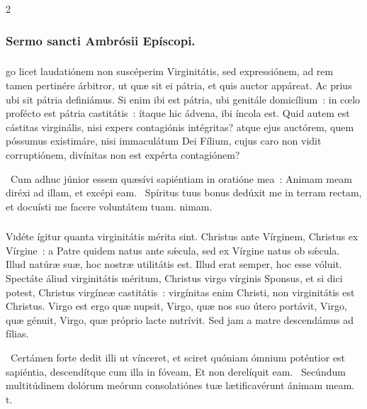 \documentclass[9pt,twoside]{extarticle}
\begin{document}
\begin{multicols}{2}
{{{\subsubsection*{\center Sermo sancti Ambrósii Epíscopi.}
\subsubsection*{\center {}}
go licet laudatiónem non suscéperim Virginitátis, sed expressiónem, ad rem tamen pertinére árbitror, ut quæ sit ei pátria, et quis auctor appáreat. Ac prius ubi sit pátria definiámus. Si enim ibi est pátria, ubi genitále domicílium~: in cœlo profécto est pátria castitátis~: ítaque hic ádvena, ibi íncola est. Quid autem est cástitas virginális, nisi expers contagiónis intégritas? atque ejus auctórem, quem póssumus existimáre, nisi immaculátum Dei Fílium, cujus caro non vidit corruptiónem, divínitas non est expérta contagiónem?

\begin{tightlist}{}
\item {}~Cum adhuc júnior essem quæsívi sapiéntiam in oratióne mea~: \textred{*} Animam meam diréxi ad illam, et excépi eam. ~Spíritus tuus bonus dedúxit me in terram rectam, et docuísti me facere voluntátem tuam. nimam.
\end{tightlist}

\subsubsection*{\center {}}
\lettrine{V}idéte ígitur quanta virginitátis mérita sint. Christus ante Vírginem, Christus ex Vírgine~: a Patre quidem natus ante sǽcula, sed ex Vírgine natus ob sǽcula. Illud natúræ suæ, hoc nostræ utilitátis est. Illud erat semper, hoc esse vóluit. Spectáte áliud virginitátis méritum, Christus virgo vírginis Sponsus, et si dici potest, Christus virgíneæ castitátis~: virgínitas enim Christi, non virginitátis est Christus. Virgo est ergo quæ nupsit, Virgo, quæ nos suo útero portávit, Virgo, quæ génuit, Virgo, quæ próprio lacte nutrívit. Sed jam a matre descendámus ad fílias.

\begin{tightlist}{}
\item {}~Certámen forte dedit illi ut vínceret, et sciret quóniam ómnium poténtior est sapiéntia, descendítque cum illa in fóveam, \textred{*} Et non derelíquit eam. ~Secúndum multitúdinem dolórum meórum consolatiónes tuæ lætificavérunt ánimam meam. t.
\end{tightlist}

}}}
\end{multicols}
\end{document}
